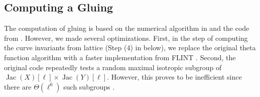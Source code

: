 \documentclass{amsproc}
\numberwithin{equation}{section}
\theoremstyle{definition}
\theoremstyle{remark}
\DeclareMathOperator{\Jac}{Jac}
\begin{document}
\subsection{Computing a Gluing}
\label{subsec:computing_gluing}
The computation of gluing is based on the numerical algorithm in \cite[\S 2.1]{1_plus_2_2_torsion_gluing} and the code from \cite{gluing_code}. 
However, we made several optimizations.
First, in the step of computing the curve invariants from lattice (Step (4) in  below), we replace the original theta function algorithm with a faster implementation from FLINT \cite{fast_theta}.
Second, the original code repeatedly tests a random maximal isotropic subgroup of $\Jac(X)[\ell]\times\Jac(Y)[\ell]$.
However, this proves to be inefficient since there are $\Theta(\ell^6)$ such subgroups \cite[Cor.~1.20]{1_plus_2_2_torsion_gluing}.
\end{document}
